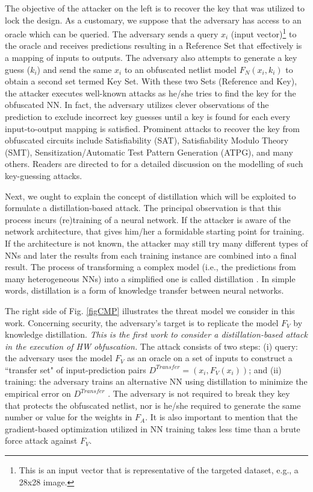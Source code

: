 \documentclass[10pt, twocolumn, conference]{IEEEtran}
\begin{document}
The objective of the attacker on the left is to recover the key that was utilized to lock the design. As a customary, we suppose that the adversary has access to an oracle which can be queried. The adversary sends a query $x_i$ (input vector)\footnote{This is an input vector that is representative of the targeted dataset, e.g., a 28x28 image.} to the oracle and receives predictions resulting in a Reference Set that effectively is a mapping of inputs to outputs. The adversary also attempts to generate a key guess ($k_i$) and send the same $x_i$ to an obfuscated netlist model $F_N(x_i,k_i)$ to obtain a second set termed Key Set. With these two Sets (Reference and Key), the attacker executes well-known attacks as he/she tries to find the key for the obfuscated NN. In fact, the adversary utilizes clever observations of the prediction to exclude incorrect key guesses until a key is found for each every input-to-output mapping is satisfied. Prominent attacks \cite{rfsat, rfsmt, rfatpg} to recover the key from obfuscated circuits include Satisfiability (SAT), Satisfiability Modulo Theory (SMT), Sensitization/Automatic Test Pattern Generation (ATPG), and many others. Readers are directed to \cite{joeanalysis} for a detailed discussion on the modelling of such key-guessing attacks.

Next, we ought to explain the concept of distillation which will be exploited to formulate a distillation-based attack. The principal observation is that this process incurs (re)training of a neural network. If the attacker is aware of the network architecture, that gives him/her a formidable starting point for training. If the architecture is not known, the attacker may still try many different types of NNs and later the results from each training instance are combined into a final result. The process of transforming a complex model (i.e., the predictions from many heterogeneous NNs) into a simplified one is called distillation \cite{rfdistilling}. In simple words, distillation is a form of knowledge transfer between neural networks.

The right side of Fig. \ref{figCMP} illustrates the threat model we consider in this work. Concerning security, the adversary's target is to replicate the model $F_V$ by knowledge distillation. \emph{This is the first work to consider a distillation-based attack in the execution of HW obfuscation.} The attack consists of two steps: (i) query: the adversary uses the model $F_V$ as an oracle on a set of inputs to construct a ``transfer set" of input-prediction pairs $D^{Transfer} = {(x_i, F_V(x_i))}$; and (ii) training: the adversary trains an alternative NN using distillation  to minimize the empirical error on $D^{Transfer}$ \cite{rfPrdPsn}. The adversary is not required to break they key that protects the obfuscated netlist, nor is he/she required to generate the same number or value for the weights in $F_A$. It is also important to mention that the gradient-based optimization utilized in NN training takes less time than a brute force attack against $F_V$. 
\end{document}
